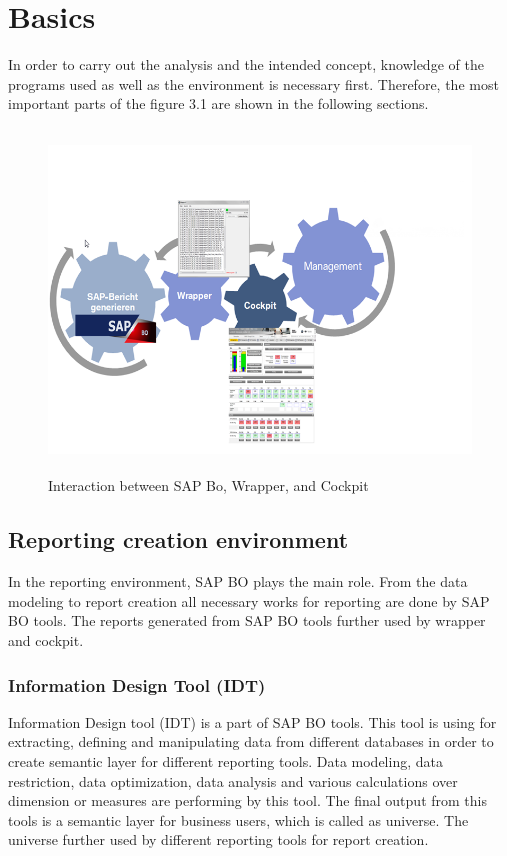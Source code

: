 \chapter{Basics}
In order to carry out the analysis and the intended concept, knowledge of the programs used as well as the environment is necessary first. Therefore, the most important parts of the figure 3.1 are shown in the following sections.

\begin{figure}[!ht]
	\centering
		\includegraphics[width=845pt, height=258pt, width=1.0\textwidth]{images/3_1.png}
	\caption[Interaction between SAP BO, Wrapper, and Cockpit]{Interaction between SAP Bo, Wrapper, and Cockpit\footnotemark} 
	\label{fig:Interaction between SAP BO, Wrapper, Cockpit}

\end{figure}
\section{Reporting creation environment }
In the reporting environment, SAP BO plays the main role. From the data modeling to report creation all necessary works for reporting are done by SAP BO tools. The reports generated from SAP BO tools further used by wrapper and cockpit.
\subsection{Information Design Tool (IDT)}
Information Design tool (IDT) is a part of SAP BO tools. This tool is using for extracting, defining  and manipulating data from different databases in order to create semantic layer for different reporting tools. Data modeling, data restriction, data optimization, data analysis and  various calculations over dimension or measures are performing by this tool. The final output from this tools is a semantic layer for business users, which is called as universe. The universe further used by different reporting tools for report creation.

